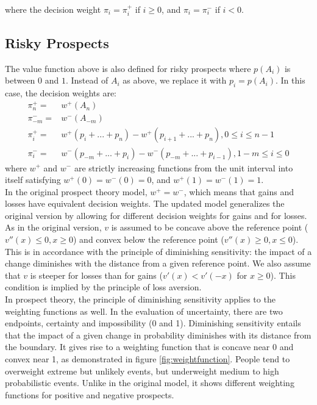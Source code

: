 \documentclass[a4paper,12pt]{article}
\numberwithin{equation}{section}
\theoremstyle{definition}
\begin{document}
where the decision weight $\pi_i = \pi_i^+$ if $i \geq 0$, and $\pi_i = \pi_i^-$ if $i < 0$. \\

\subsection{Risky Prospects}
The value function above is also defined for risky prospects where $p(A_i)$ is between $0$ and $1$. Instead of $A_i$ as above, we replace it with $p_i = p(A_i)$. In this case, the decision weights are:
\begin{eqnarray*}
\pi_n^+ =& w^+(A_n)\\
\pi_{-m}^- =& w^-(A_{-m})\\
\pi_i^+ =& w^+(p_i+ ... + p_n) - w^+(p_{i+1}+ ... + p_n), 0 \leq i \leq n - 1\\
\pi_i^- =& w^-(p_{-m}+ ... + p_i) - w^-(p_{-m}+ ... + p_{i-1}), 1 - m \leq i \leq 0
\end{eqnarray*}
where $w^+$ and $w^-$ are strictly increasing functions from the unit interval into itself satisfying $w^+(0) = w^-(0) = 0$, and $w^+(1) = w^-(1) = 1$.
\\

In the original prospect theory model, $w^+ = w^-$, which means that gains and losses have equivalent decision weights. The updated model generalizes the original version by allowing for different decision weights for gains and for losses. 
\\

As in the original version, $v$ is assumed to be concave above the reference point ($v''(x) \leq 0, x \geq 0$) and convex below the reference point ($v''(x) \geq 0, x \leq 0$). This is in accordance with the principle of diminishing sensitivity: the impact of a change diminishes with the distance from a given reference point. We also assume that $v$ is steeper for losses than for gains ($v'(x) < v'(-x)$ for $x \geq 0$). This condition is implied by the principle of loss aversion.
\\

In prospect theory, the principle of diminishing sensitivity applies to the weighting functions as well. In the evaluation of uncertainty, there are two endpoints, certainty and impossibility (0 and 1). Diminishing sensitivity entails that the impact of a given change in probability diminishes with its distance from the boundary. It gives rise to a weighting function that is concave near 0 and convex near 1, as demonstrated in figure \ref{fig:weightfunction}. People tend to overweight extreme but unlikely events, but underweight medium to high probabilistic events. Unlike in the original model, it shows different weighting functions for positive and negative prospects.
\\
\end{document}

